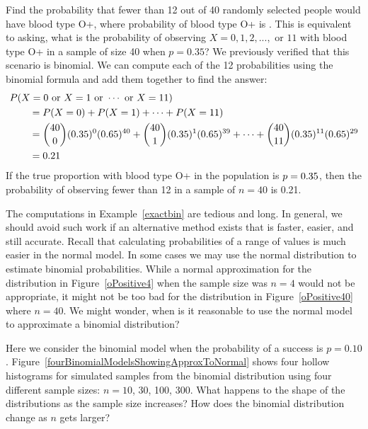 \begin{examplewrap}
\begin{nexample}
{Find the probability that fewer than 12 out of 40 randomly selected people would have blood type O+, where probability of blood type O+ is \oposprob{}.}
This is equivalent to asking, what is the probability of observing $X=0, 1, 2, ..., \text{ or } 11$ with blood type O+ in a sample of size 40 when $p=0.35$?  We previously verified that this scenario is binomial.  We can compute each of the 12 probabilities using the binomial formula and add them together to find the answer:
 \begin{align*}
  &P(X=0\text{ or }X=1\text{ or }\cdots\text{ or } X=11) \\
	&\qquad = P(X=0) + P(X=1) + \cdots + P(X=11) \\
	&\qquad = {40\choose 0}(0.35{})^0(0.65{})^{40} + {40\choose 1}(0.35{})^1(0.65{})^{39} + \cdots + {40\choose 11}(0.35{})^{11}(0.65{})^{29}\\
	&\qquad = 0.21
  \end{align*}
If the true proportion with blood type O+ in the population is $p = 0.35{}$, then the probability of observing fewer than 12 in a sample of $n = 40$ is 0.21.
\end{nexample}
\end{examplewrap}
\label{exactbin}

The computations in Example~\ref{exactbin} are tedious and long.  In general, we should avoid such work if an alternative method exists that is faster, easier, and still accurate. Recall that calculating probabilities of a range of values is much easier in the normal model. In some cases we may use the normal distribution to estimate binomial probabilities. While a normal approximation for the distribution in Figure~\ref{oPositive4} when the sample size was $n = 4$ would not be appropriate, it might not be too bad for the distribution in Figure~\ref{oPositive40} where $n = 40$.  We might wonder, when is it reasonable to use the normal model to approximate a binomial distribution?

\begin{exercisewrap}
\begin{nexercise}
Here we consider the binomial model when the probability of a success is $p=0.10$. Figure~\ref{fourBinomialModelsShowingApproxToNormal} shows four hollow histograms for simulated samples from the binomial distribution using four different sample sizes: $n=10$, 30, 100, 300. What happens to the shape of the distributions as the sample size increases?  How does the binomial distribution change as $n$ gets larger?\footnotemark
\end{nexercise}
\end{exercisewrap}

